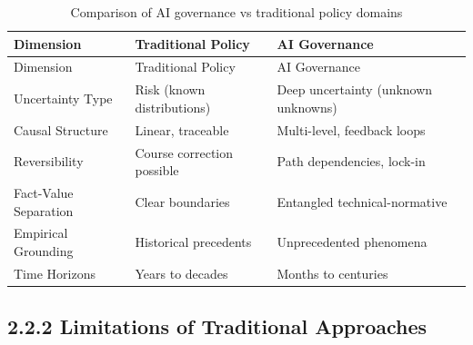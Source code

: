 \documentclass[
  11pt,
  letterpaper,
]{book}
\begin{document}
\begin{longtable}[]{@{}
  >{\raggedright\arraybackslash}p{}
  >{\raggedright\arraybackslash}p{}
  >{\raggedright\arraybackslash}p{}@{}}
\caption{Comparison of AI governance vs traditional policy
domains}\label{tbl-governance-challenges}\tabularnewline
\toprule\noalign{}
\begin{minipage}[b]{\linewidth}\raggedright
Dimension
\end{minipage} & \begin{minipage}[b]{\linewidth}\raggedright
Traditional Policy
\end{minipage} & \begin{minipage}[b]{\linewidth}\raggedright
AI Governance
\end{minipage} \\
\midrule\noalign{}
\endfirsthead
\toprule\noalign{}
\begin{minipage}[b]{\linewidth}\raggedright
Dimension
\end{minipage} & \begin{minipage}[b]{\linewidth}\raggedright
Traditional Policy
\end{minipage} & \begin{minipage}[b]{\linewidth}\raggedright
AI Governance
\end{minipage} \\
\midrule\noalign{}
\endhead
\bottomrule\noalign{}
\endlastfoot
Uncertainty Type & Risk (known distributions) & Deep uncertainty
(unknown unknowns) \\
Causal Structure & Linear, traceable & Multi-level, feedback loops \\
Reversibility & Course correction possible & Path dependencies,
lock-in \\
Fact-Value Separation & Clear boundaries & Entangled
technical-normative \\
Empirical Grounding & Historical precedents & Unprecedented phenomena \\
Time Horizons & Years to decades & Months to centuries \\
\end{longtable}

\subsection{2.2.2 Limitations of Traditional
Approaches}\label{limitations-of-traditional-approaches}
\end{document}
